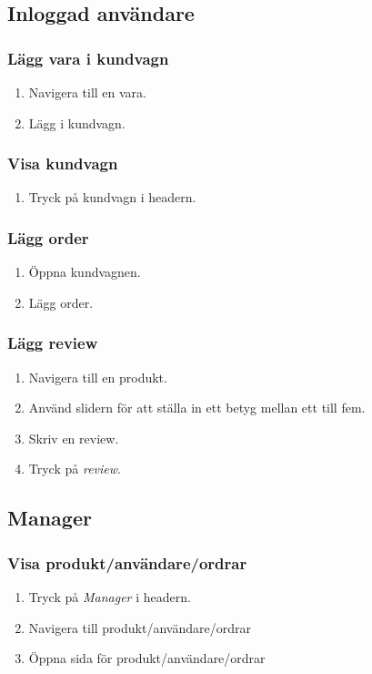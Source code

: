 \documentclass[a4paper]{article}
\begin{document}
\subsection{Inloggad användare}
\subsubsection{Lägg vara i kundvagn}
\begin{enumerate}
  \item Navigera till en vara.
  \item Lägg i kundvagn.
\end{enumerate}
%
\subsubsection{Visa kundvagn}
\begin{enumerate}
  \item Tryck på kundvagn i headern.
\end{enumerate}
%
\subsubsection{Lägg order}
\begin{enumerate}
  \item Öppna kundvagnen.
  \item Lägg order.
\end{enumerate}
%
\subsubsection{Lägg review}
\begin{enumerate}
  \item Navigera till en produkt.
  \item Använd slidern för att ställa in ett betyg mellan ett till fem.
  \item Skriv en review.
  \item Tryck på \textit{review}.
\end{enumerate}
%
\subsection{Manager}
\subsubsection{Visa produkt/användare/ordrar}
\begin{enumerate}
  \item Tryck på \textit{Manager} i headern.
  \item Navigera till produkt/användare/ordrar
  \item Öppna sida för produkt/användare/ordrar
\end{enumerate}
%
\end{document}
